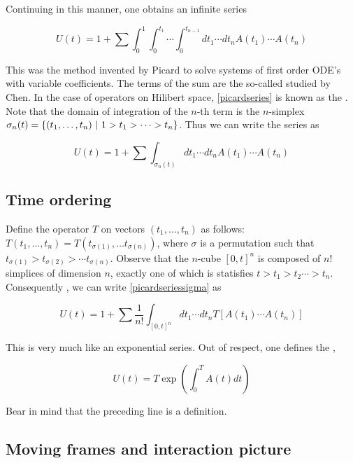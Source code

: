 Continuing in this manner, one obtains an infinite series

\begin{equation}
\label{picardseries}
U(t) = 1 + \sum \int_0^1 \int_0^{t_1}\cdots \int_0^{t_{n-1}} dt_1 \cdots dt_n A(t_1) \cdots A(t_n)
\end{equation}

This was the method invented by Picard to solve systems of first order ODE's with variable coefficients.  The terms of the sum are the so-called   studied by Chen.  In the case of operators on Hilibert space, \eqref{picardseries} is known as the .  Note that the domain of integration of the $n$-th term is the $n$-simplex $\sigma_{n}(t) = \{(t_1, \ldots, t_n)\ |\  1 > t_1 > \cdots > t_n \}$. Thus we can write the series as

\begin{equation}
\label{picardseriessigma}
U(t) = 1 + \sum \int_{\sigma_n(t)} dt_1 \cdots dt_n A(t_1) \cdots A(t_n)
\end{equation}


\subsection{Time ordering}

Define the  operator $T$ on vectors $(t_1, \ldots, t_n)$ as follows:
$T(t_1, \ldots, t_n) = T(t_{\sigma(1)}, \ldots t_{\sigma(n)})$, where $\sigma$ is a permutation such that $t_{\sigma(1)} > t_{\sigma(2)} > \cdots t_{\sigma(n)}$.  Observe that the $n$-cube $[0,t]^n$ is composed of $n!$ simplices of dimension $n$, exactly one of which is statisfies $t > t_1 > t_2 \cdots > t_n$.  Consequently , we can write \eqref{picardseriessigma} as

\begin{equation}
\label{propagator_series}
U(t) = 1 + \sum \frac{1}{n!}\int_{[0,t]^n} dt_1 \cdots dt_n T[A(t_1) \cdots A(t_n)]
\end{equation}

This is very much like an exponential series.  Out of respect, one defines the ,

\begin{equation}
U(t) = T\exp\left( \int_0^T A(t)dt \right)
\end{equation}

Bear in mind that the preceding line is a definition.

\subsection{Moving frames and interaction picture}

